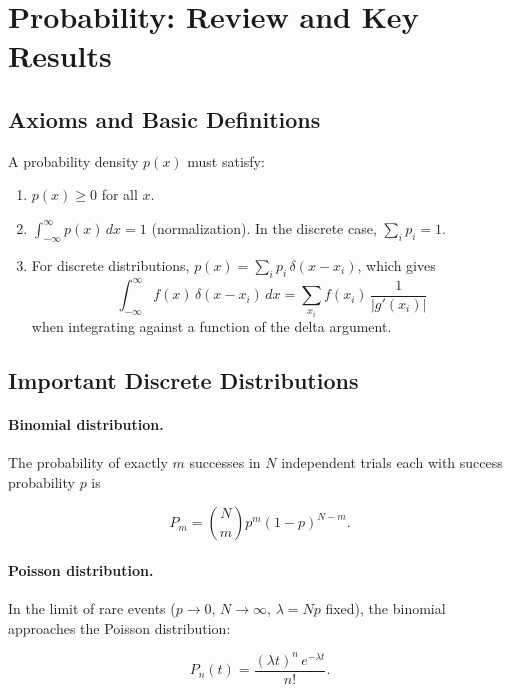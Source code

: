 \section{Probability: Review and Key Results}

\subsection{Axioms and Basic Definitions}

A probability density $p(x)$ must satisfy:
\begin{enumerate}
  \item $p(x) \ge 0$ for all $x$.
  \item $\int_{-\infty}^{\infty} p(x)\,dx = 1$ (normalization). In the discrete case, $\sum_i p_i = 1$.
  \item For discrete distributions, $p(x) = \sum_i p_i\,\delta(x-x_i)$, which gives
        \begin{equation}
          \int_{-\infty}^{\infty} f(x)\,\delta(x-x_i)\,dx = \sum_{x_i} f(x_i)\,\frac{1}{|g'(x_i)|}
        \end{equation}
        when integrating against a function of the delta argument.
\end{enumerate}

\subsection{Important Discrete Distributions}

\paragraph{Binomial distribution.} The probability of exactly $m$ successes in $N$ independent trials each with success probability $p$ is

\begin{equation}
  P_m = \binom{N}{m} p^m (1-p)^{N-m}.
\end{equation}

\paragraph{Poisson distribution.} In the limit of rare events ($p\to 0$, $N\to\infty$, $\lambda=Np$ fixed), the binomial approaches the Poisson distribution:

\begin{equation}
  P_n(t) = \frac{(\lambda t)^n\,e^{-\lambda t}}{n!}.
\end{equation}


